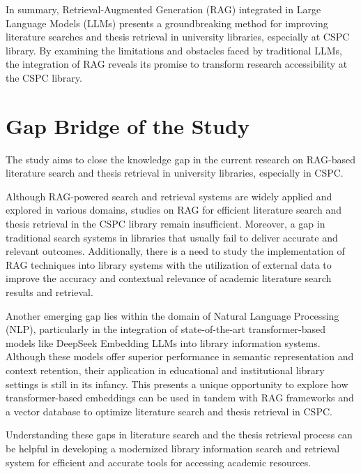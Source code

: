 \begin{refsection}
\hspace{0.4cm} In summary, Retrieval-Augmented Generation (RAG) integrated in Large Language Models (LLMs) presents a groundbreaking method for improving literature searches and thesis retrieval in university libraries, especially at CSPC library. By examining the limitations and obstacles faced by traditional LLMs, the integration of RAG reveals its promise to transform research accessibility at the CSPC library.

\section{Gap Bridge of the Study}
\hspace{1cm}The study aims to close the knowledge gap in the current research on RAG-based literature search and thesis retrieval in university libraries, especially in CSPC.

\bigbreak
\hspace{0.4cm}Although RAG-powered search and retrieval systems are widely applied and explored in various domains, studies on RAG for efficient literature search and thesis retrieval in the CSPC library remain insufficient. Moreover, a gap in traditional search systems in libraries that usually fail to deliver accurate and relevant outcomes. Additionally, there is a need to study the implementation of RAG techniques into library systems with the utilization of external data to improve the accuracy and contextual relevance of academic literature search results and retrieval. 

\hspace{0.4cm}Another emerging gap lies within the domain of Natural Language Processing (NLP), particularly in the integration of state-of-the-art transformer-based models like DeepSeek Embedding LLMs into library information systems. Although these models offer superior performance in semantic representation and context retention, their application in educational and institutional library settings is still in its infancy. This presents a unique opportunity to explore how transformer-based embeddings can be used in tandem with RAG frameworks and a vector database to optimize literature search and thesis retrieval in CSPC.

\hspace{0.4cm}Understanding these gaps in literature search and the thesis retrieval process can be helpful in developing a modernized library information search and retrieval system for efficient and accurate tools for accessing academic resources. 


\clearpage

\printbibliography[heading=subbibintoc, title={\centering Notes}]
\end{refsection}